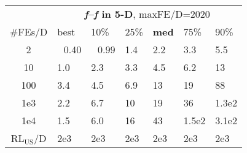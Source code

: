 \begin{tabular}{c|llllll}
 & \multicolumn{6}{|c}{\textbf{\textit{f}\raisebox{-0.35ex}{1}--\textit{f}\raisebox{-0.35ex}{24} in 5-D}, maxFE/D=2020}\\
\#FEs/D & best & 10\% & 25\% & \textbf{med} & 75\% & 90\%\\
2 & ~\,0.40 & ~\,0.99 & \hspace*{1ex}1.4 & \hspace*{1ex}2.2 & \hspace*{1ex}3.3 & \hspace*{1ex}5.5\\
10 & \hspace*{1ex}1.0 & \hspace*{1ex}2.3 & \hspace*{1ex}3.3 & \hspace*{1ex}4.5 & \hspace*{1ex}6.2 & 13\\
100 & \hspace*{1ex}3.4 & \hspace*{1ex}4.5 & \hspace*{1ex}6.9 & 13 & 19 & 88\\
1e3 & \hspace*{1ex}2.2 & \hspace*{1ex}6.7 & 10 & 19 & 36 & 1.3e2\\
1e4 & \hspace*{1ex}1.5 & \hspace*{1ex}6.0 & 16 & 43 & 1.5e2 & 3.1e2\\
$\text{RL}_{\text{US}}$/D & 2e3 & 2e3 & 2e3 & 2e3 & 2e3 & 2e3
\end{tabular}
